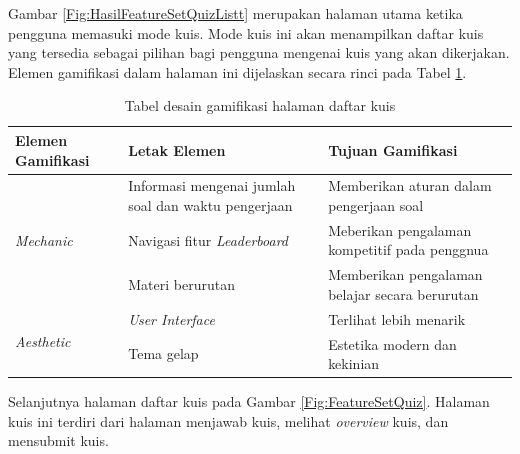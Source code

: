 Gambar \ref*{Fig:HasilFeatureSetQuizListt} merupakan halaman utama ketika pengguna memasuki mode kuis. Mode kuis ini akan menampilkan daftar kuis yang tersedia sebagai pilihan bagi pengguna mengenai kuis yang akan dikerjakan.
Elemen gamifikasi dalam halaman ini dijelaskan secara rinci pada Tabel \ref*{TabelGameDaftarKuis}.
\begin{table}[H]
	\caption{Tabel desain gamifikasi halaman daftar kuis}
	\label{TabelGameDaftarKuis}
	\begin{tabular}{|m{3.6cm}|m{}|m{}|}
		\hline
		Elemen Gamifikasi& Letak Elemen & Tujuan Gamifikasi\\
		\hline
		\multirow{3}{1cm}{\textit{Mechanic}}&Informasi mengenai jumlah soal dan waktu pengerjaan& Memberikan aturan dalam pengerjaan soal\\
		\cline{2-3}
		&Navigasi fitur \textit{Leaderboard}&Meberikan pengalaman kompetitif pada penggnua\\
		\hline
		\textit{Dynamic}&Materi berurutan&Memberikan pengalaman belajar secara berurutan \\
		\hline
		\multirow{3}{1cm}{\textit{Aesthetic}}&\textit{User Interface}&Terlihat lebih menarik\\
		\cline{2-3}
		& Tema gelap & Estetika modern dan kekinian \\
		\hline
	\end{tabular}
\end{table}
\newpage
Selanjutnya halaman daftar kuis pada Gambar \ref*{Fig:FeatureSetQuiz}.
Halaman kuis ini terdiri dari halaman menjawab kuis, melihat \textit{overview} kuis, dan mensubmit kuis.
